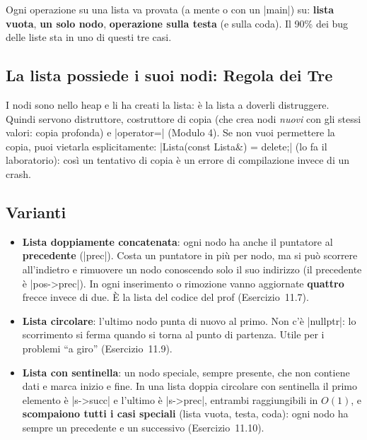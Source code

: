 \begin{consiglio}
Ogni operazione su una lista va provata (a mente o con un \cc|main|) su: \textbf{lista
vuota}, \textbf{un solo nodo}, \textbf{operazione sulla testa} (e sulla coda). Il 90\%
dei bug delle liste sta in uno di questi tre casi.
\end{consiglio}

\subsection*{La lista possiede i suoi nodi: Regola dei Tre}

I nodi sono nello heap e li ha creati la lista: è la lista a doverli distruggere. Quindi
servono distruttore, costruttore di copia (che crea nodi \emph{nuovi} con gli stessi
valori: copia profonda) e \cc|operator=| (Modulo 4). Se non vuoi permettere la copia,
puoi vietarla esplicitamente:
\cc|Lista(const Lista&) = delete;| (lo fa il laboratorio): così un tentativo di copia
è un errore di compilazione invece di un crash.

\subsection*{Varianti}

\begin{itemize}
  \item \textbf{Lista doppiamente concatenata}: ogni nodo ha anche il puntatore al
        \textbf{precedente} (\cc|prec|). Costa un puntatore in più per nodo, ma si può
        scorrere all'indietro e rimuovere un nodo conoscendo solo il suo indirizzo
        (il precedente è \cc|pos->prec|). In ogni inserimento o rimozione vanno
        aggiornate \textbf{quattro} frecce invece di due. È la lista del codice del prof
        (Esercizio~11.7).
  \item \textbf{Lista circolare}: l'ultimo nodo punta di nuovo al primo. Non c'è
        \cc|nullptr|: lo scorrimento si ferma quando si torna al punto di partenza.
        Utile per i problemi ``a giro'' (Esercizio~11.9).
  \item \textbf{Lista con sentinella}: un nodo speciale, sempre presente, che non
        contiene dati e marca inizio e fine. In una lista doppia circolare con
        sentinella il primo elemento è \cc|s->succ| e l'ultimo è \cc|s->prec|, entrambi
        raggiungibili in $O(1)$, e \textbf{scompaiono tutti i casi speciali}
        (lista vuota, testa, coda): ogni nodo ha sempre un precedente e un successivo
        (Esercizio~11.10).
\end{itemize}

